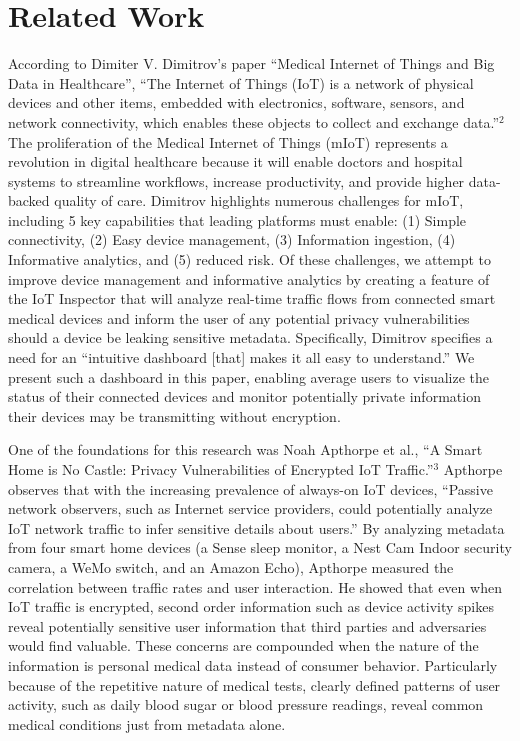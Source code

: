 
\section{Related Work}

According to Dimiter V. Dimitrov's paper ``Medical Internet of Things and Big Data in Healthcare'', ``The Internet of Things (IoT) is a network of physical devices and other items, embedded with electronics, software, sensors, and network connectivity, which enables these objects to collect and exchange data.''$^2$ The proliferation of the Medical Internet of Things (mIoT) represents a revolution in digital healthcare because it will enable doctors and hospital systems to streamline workflows, increase productivity, and provide higher data-backed quality of care. Dimitrov highlights numerous challenges for mIoT, including 5 key capabilities that leading platforms must enable: (1) Simple connectivity, (2) Easy device management, (3) Information ingestion, (4) Informative analytics, and (5) reduced risk. Of these challenges, we attempt to improve device management and informative analytics by creating a feature of the IoT Inspector that will analyze real-time traffic flows from connected smart medical devices and inform the user of any potential privacy vulnerabilities should a device be leaking sensitive metadata. Specifically, Dimitrov specifies a need for an ``intuitive dashboard [that] makes it all easy to understand.'' We present such a dashboard in this paper, enabling average users to visualize the status of their connected devices and monitor potentially private information their devices may be transmitting without encryption. 

One of the foundations for this research was Noah Apthorpe et al., ``A Smart Home is No Castle: Privacy Vulnerabilities of Encrypted IoT Traffic.''$^3$ Apthorpe observes that with the increasing prevalence of always-on IoT devices, ``Passive network observers, such as Internet service providers, could potentially analyze IoT network traffic to infer sensitive details about users.'' By analyzing metadata from four smart home devices (a Sense sleep monitor, a Nest Cam Indoor security camera, a WeMo switch, and an Amazon Echo), Apthorpe measured the correlation between traffic rates and user interaction. He showed that even when IoT traffic is encrypted, second order information such as device activity spikes reveal potentially sensitive user information that third parties and adversaries would find valuable. These concerns are compounded when the nature of the information is personal medical data instead of consumer behavior. Particularly because of the repetitive nature of medical tests, clearly defined patterns of user activity, such as daily blood sugar or blood pressure readings, reveal common medical conditions just from metadata alone. 

